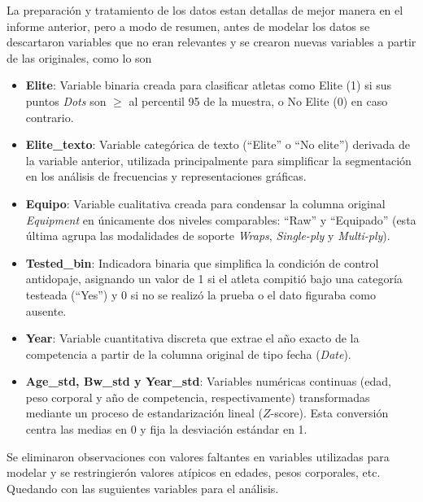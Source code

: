 \documentclass[letter]{article}
\begin{document}
La preparación y tratamiento de los datos estan detallas de mejor manera en el informe anterior, pero a modo de resumen, antes de modelar 
los datos se descartaron variables que no eran relevantes y se crearon nuevas variables a partir de las originales, como lo son

\begin{itemize}
    \item \textbf{Elite}: Variable binaria creada para clasificar atletas como Elite (1) si sus puntos \textit{Dots} son $\geq$ al percentil 95 de la muestra, o No Elite (0) en caso contrario.
    \item \textbf{Elite\_texto}: Variable categórica de texto (``Elite'' o ``No elite'') derivada de la variable anterior, utilizada principalmente para simplificar la segmentación en los análisis de frecuencias y representaciones gráficas.
    \item \textbf{Equipo}: Variable cualitativa creada para condensar la columna original \textit{Equipment} en únicamente dos niveles comparables: ``Raw'' y ``Equipado'' (esta última agrupa las modalidades de soporte \textit{Wraps}, \textit{Single-ply} y \textit{Multi-ply}).
    \item \textbf{Tested\_bin}: Indicadora binaria que simplifica la condición de control antidopaje, asignando un valor de 1 si el atleta compitió bajo una categoría testeada (``Yes'') y 0 si no se realizó la prueba o el dato figuraba como ausente.
    \item \textbf{Year}: Variable cuantitativa discreta que extrae el año exacto de la competencia a partir de la columna original de tipo fecha (\textit{Date}).
    \item \textbf{Age\_std, Bw\_std y Year\_std}: Variables numéricas continuas (edad, peso corporal y año de competencia, respectivamente) transformadas mediante un proceso de estandarización lineal ($Z$-score). Esta conversión centra las medias en 0 y fija la desviación estándar en 1. 
\end{itemize}

Se eliminaron observaciones con valores faltantes en variables utilizadas para modelar y se restringierón valores atípicos en edades, pesos corporales, etc. Quedando con las suguientes 
variables para el análisis. 

\newpage
\end{document}
